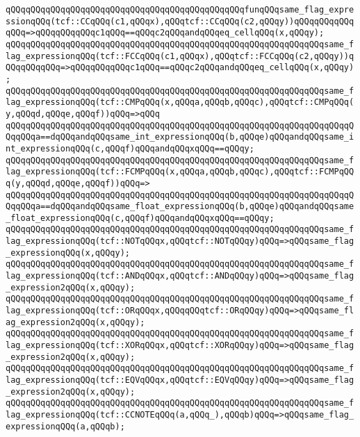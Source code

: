 \verb|qQQqqQQqqQQqqQQqqQQqqQQqqQQqqQQqqQQqqQQqqQQqqQQqfunqQQqsame_flag_expressionqQQq(tcf::CCqQQq(c1,qQQqx),qQQqtcf::CCqQQq(c2,qQQqy))qQQqqQQqqQQqqQQq=>qQQqqQQqqQQqc1qQQq==qQQqc2qQQqandqQQqeq_cellqQQq(x,qQQqy);|\newline
\verb|qQQqqQQqqQQqqQQqqQQqqQQqqQQqqQQqqQQqqQQqqQQqqQQqqQQqqQQqqQQqqQQqsame_flag_expressionqQQq(tcf::FCCqQQq(c1,qQQqx),qQQqtcf::FCCqQQq(c2,qQQqy))qQQqqQQqqQQq=>qQQqqQQqqQQqc1qQQq==qQQqc2qQQqandqQQqeq_cellqQQq(x,qQQqy);|\newline
\verb|qQQqqQQqqQQqqQQqqQQqqQQqqQQqqQQqqQQqqQQqqQQqqQQqqQQqqQQqqQQqqQQqsame_flag_expressionqQQq(tcf::CMPqQQq(x,qQQqa,qQQqb,qQQqc),qQQqtcf::CMPqQQq(y,qQQqd,qQQqe,qQQqf))qQQq=>qQQq|\newline
\verb|qQQqqQQqqQQqqQQqqQQqqQQqqQQqqQQqqQQqqQQqqQQqqQQqqQQqqQQqqQQqqQQqqQQqqQQqqQQqa==dqQQqandqQQqsame_int_expressionqQQq(b,qQQqe)qQQqandqQQqsame_int_expressionqQQq(c,qQQqf)qQQqandqQQqxqQQq==qQQqy;|\newline
\verb|qQQqqQQqqQQqqQQqqQQqqQQqqQQqqQQqqQQqqQQqqQQqqQQqqQQqqQQqqQQqqQQqsame_flag_expressionqQQq(tcf::FCMPqQQq(x,qQQqa,qQQqb,qQQqc),qQQqtcf::FCMPqQQq(y,qQQqd,qQQqe,qQQqf))qQQq=>|\newline
\verb|qQQqqQQqqQQqqQQqqQQqqQQqqQQqqQQqqQQqqQQqqQQqqQQqqQQqqQQqqQQqqQQqqQQqqQQqqQQqa==dqQQqandqQQqsame_float_expressionqQQq(b,qQQqe)qQQqandqQQqsame_float_expressionqQQq(c,qQQqf)qQQqandqQQqxqQQq==qQQqy;|\newline
\verb|qQQqqQQqqQQqqQQqqQQqqQQqqQQqqQQqqQQqqQQqqQQqqQQqqQQqqQQqqQQqqQQqsame_flag_expressionqQQq(tcf::NOTqQQqx,qQQqtcf::NOTqQQqy)qQQq=>qQQqsame_flag_expressionqQQq(x,qQQqy);|\newline
\verb|qQQqqQQqqQQqqQQqqQQqqQQqqQQqqQQqqQQqqQQqqQQqqQQqqQQqqQQqqQQqqQQqsame_flag_expressionqQQq(tcf::ANDqQQqx,qQQqtcf::ANDqQQqy)qQQq=>qQQqsame_flag_expression2qQQq(x,qQQqy);|\newline
\verb|qQQqqQQqqQQqqQQqqQQqqQQqqQQqqQQqqQQqqQQqqQQqqQQqqQQqqQQqqQQqqQQqsame_flag_expressionqQQq(tcf::ORqQQqx,qQQqqQQqtcf::ORqQQqy)qQQq=>qQQqsame_flag_expression2qQQq(x,qQQqy);|\newline
\verb|qQQqqQQqqQQqqQQqqQQqqQQqqQQqqQQqqQQqqQQqqQQqqQQqqQQqqQQqqQQqqQQqsame_flag_expressionqQQq(tcf::XORqQQqx,qQQqtcf::XORqQQqy)qQQq=>qQQqsame_flag_expression2qQQq(x,qQQqy);|\newline
\verb|qQQqqQQqqQQqqQQqqQQqqQQqqQQqqQQqqQQqqQQqqQQqqQQqqQQqqQQqqQQqqQQqsame_flag_expressionqQQq(tcf::EQVqQQqx,qQQqtcf::EQVqQQqy)qQQq=>qQQqsame_flag_expression2qQQq(x,qQQqy);|\newline
\verb|qQQqqQQqqQQqqQQqqQQqqQQqqQQqqQQqqQQqqQQqqQQqqQQqqQQqqQQqqQQqqQQqsame_flag_expressionqQQq(tcf::CCNOTEqQQq(a,qQQq_),qQQqb)qQQq=>qQQqsame_flag_expressionqQQq(a,qQQqb);|\newline
